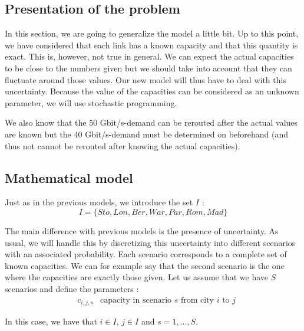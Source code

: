 \subsection{Presentation of the problem}
In this section, we are going to generalize the model a little bit. Up to this point, we have considered that each link has a known capacity and that this quantity is exact. This is, however, not true in general. We can expect the actual capacities to be close to the numbers given but we should take into account that they can fluctuate around those values. Our new model will thus have to deal with this uncertainty. Because the value of the capacities can be considered as an unknown parameter, we will use stochastic programming.

We also know that the 50 Gbit/s-demand can be rerouted after the actual values are known but the 40 Gbit/s-demand must be determined on beforehand (and thus not cannot be rerouted after knowing the actual capacities).

\subsection{Mathematical model}
Just as in the previous models, we introduce the set $I$ :
$$I = \{ Sto,Lon,Ber,War,Par,Rom,Mad\}$$

The main difference with previous models is the presence of uncertainty. As usual, we will handle this by discretizing this uncertainty into different scenarios with an associated probability. Each scenario corresponds to a complete set of known capacities. We can for example say that the second scenario is the one where the capacities are exactly those given. Let us assume that we have $S$ scenarios and define the parameters : 
\begin{align*}
&c_{i,j,s} &\text{capacity in scenario $s$ from city $i$ to $j$} 
\end{align*}

In this case, we have that $i\in I$, $j\in I$ and $s = 1,...,S$.



 
